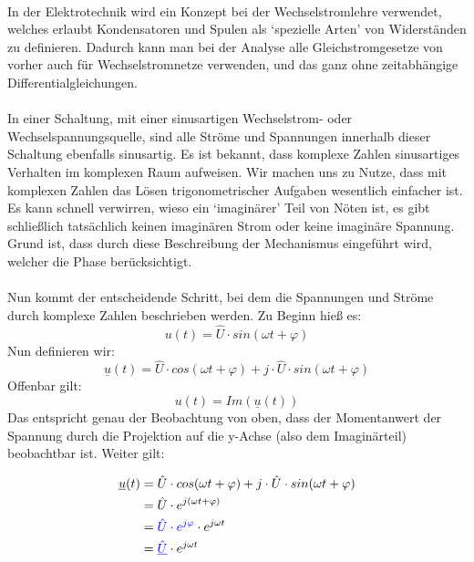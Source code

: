 \documentclass{article}
\begin{document}
\begin{mdframed}
\centering
\vspace{0.2\baselineskip}
\\
\vspace{0.2\baselineskip}
\justify
In der Elektrotechnik wird ein Konzept bei der Wechselstromlehre verwendet, welches erlaubt Kondensatoren und Spulen als `spezielle Arten' von Widerständen zu definieren. Dadurch kann man bei der Analyse alle Gleichstromgesetze von vorher auch für Wechselstromnetze verwenden, und das ganz ohne zeitabhängige Differentialgleichungen.\\ \\ 
In einer Schaltung, mit einer sinusartigen Wechselstrom- oder Wechselspannungsquelle, sind alle Ströme und Spannungen innerhalb dieser Schaltung ebenfalls sinusartig.
Es ist bekannt, dass komplexe Zahlen sinusartiges Verhalten im komplexen Raum aufweisen. Wir machen uns zu Nutze, dass mit komplexen Zahlen das Lösen trigonometrischer Aufgaben wesentlich einfacher ist. Es kann schnell verwirren, wieso ein `imaginärer' Teil von Nöten ist, es gibt schließlich tatsächlich keinen imaginären Strom oder keine imaginäre Spannung. Grund ist, dass durch diese Beschreibung der Mechanismus eingeführt wird, welcher die Phase berücksichtigt. \\ \\
Nun kommt der entscheidende Schritt, bei dem die Spannungen und Ströme durch komplexe Zahlen beschrieben werden. Zu Beginn hieß es:
\[u(t) = \hat{U} \cdot sin(\omega t + \varphi)\]
Nun definieren wir:
\[\underline{u}(t) = \hat{U} \cdot cos(\omega t + \varphi) + j \cdot \hat{U} \cdot sin(\omega t + \varphi)\]
Offenbar gilt:
\[u(t) = Im(\underline{u}(t))\]
Das entspricht genau der Beobachtung von oben, dass der Momentanwert der Spannung durch die Projektion auf die y-Achse (also dem Imaginärteil) beobachtbar ist. Weiter gilt:
\justify
\centering
\hspace{5\baselineskip}
\begin{minipage}{0.4\textwidth}
\begin{align*}
    \underline{u}(t) &= \hat{U} \cdot cos(\omega t + \varphi) + j \cdot \hat{U} \cdot sin(\omega t + \varphi)\\
    &= \hat{U} \cdot e^{j(\omega t + \varphi)}\\
    &= \textcolor{blue}{\hat{U} \cdot e^{j\varphi}} \cdot e^{j\omega t}\\
    &= \textcolor{blue}{\underline{\hat{U}}} \cdot e^{j\omega t}

\end{align*}
\end{minipage}
\end{mdframed}
\end{document}
